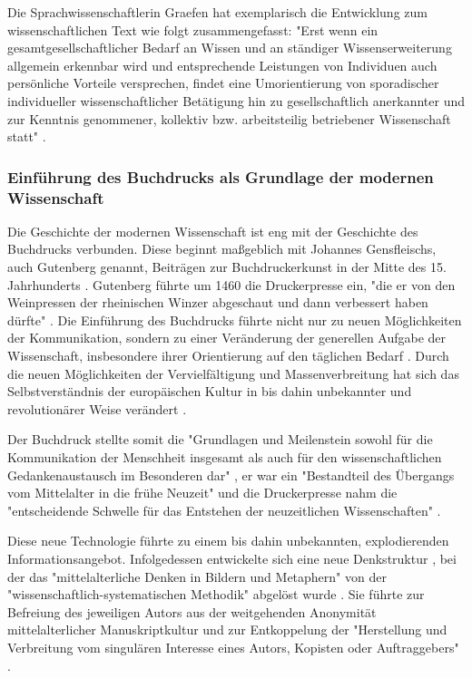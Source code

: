 Die Sprachwissenschaftlerin Graefen hat exemplarisch die Entwicklung zum wissenschaftlichen Text wie folgt zusammengefasst: "Erst wenn ein gesamtgesellschaftlicher Bedarf an Wissen und an ständiger Wissenserweiterung allgemein erkennbar wird und entsprechende Leistungen von Individuen auch persönliche Vorteile versprechen, findet eine Umorientierung von sporadischer individueller wissenschaftlicher Betätigung hin zu gesellschaftlich anerkannter und zur Kenntnis genommener, kollektiv bzw. arbeitsteilig betriebener Wissenschaft statt" \cite[:56]{Graefen_2007}.

\subsubsection{Einführung des Buchdrucks als Grundlage der modernen Wissenschaft}

Die Geschichte der modernen Wissenschaft ist eng mit der Geschichte des Buchdrucks verbunden. Diese beginnt maßgeblich mit Johannes Gensfleischs, auch Gutenberg genannt, Beiträgen zur Buchdruckerkunst in der Mitte des 15. Jahrhunderts \cite{Wittmann_1999}. Gutenberg führte um 1460 die Druckerpresse ein, "die er von den Weinpressen der rheinischen Winzer abgeschaut und dann verbessert haben dürfte" \cite[:22]{Stober_2014}. Die Einführung des Buchdrucks führte nicht nur zu neuen Möglichkeiten der Kommunikation, sondern zu einer Veränderung der generellen Aufgabe der Wissenschaft, insbesondere ihrer Orientierung auf den täglichen Bedarf \cite[:148]{Luhmann_1998}. Durch die neuen Möglichkeiten der Vervielfältigung und Massenverbreitung hat sich das Selbstverständnis der europäischen Kultur in bis dahin unbekannter \cite{Giesecke_1991} und revolutionärer Weise verändert \cite{Wunderlich_2008} \cite{Stober_2014} \cite[:211]{Porter_1964}.

Der Buchdruck stellte somit die "Grundlagen und Meilenstein sowohl für die Kommunikation der Menschheit insgesamt als auch für den wissenschaftlichen Gedankenaustausch im Besonderen dar" \cite[:7]{Schirmbacher_2009}, er war ein "Bestandteil des Übergangs vom Mittelalter in die frühe Neuzeit" \cite[:32]{Lange_2008} und die Druckerpresse nahm die "entscheidende Schwelle für das Entstehen der neuzeitlichen Wissenschaften" \cite[:602]{Luhmann_1997}.

Diese neue Technologie führte zu einem bis dahin unbekannten, explodierenden Informationsangebot. Infolgedessen entwickelte sich eine neue Denkstruktur \cite{Eisenstein_1997}, bei der das "mittelalterliche Denken in Bildern und Metaphern" von der "wissenschaftlich-systematischen Methodik" abgelöst wurde \cite[:16]{Wunderlich_2008}. Sie führte zur Befreiung des jeweiligen Autors aus der weitgehenden Anonymität mittelalterlicher Manuskriptkultur und zur Entkoppelung der "Herstellung und Verbreitung vom singulären Interesse eines Autors, Kopisten oder Auftraggebers" \cite[:15]{Wunderlich_2008}.


